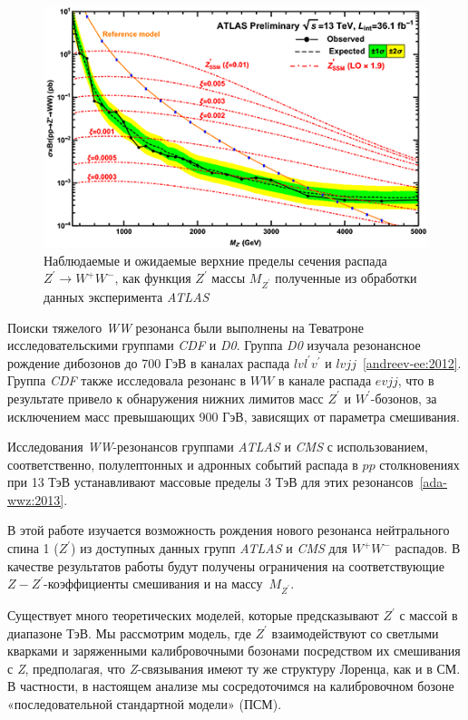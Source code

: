 \begin{figure}[!h]
	\centering
	\includegraphics[width=\textwidth]{figures/graph-1-verify.png}
	\caption{Наблюдаемые и ожидаемые верхние пределы сечения распада ${Z}^{\prime} \rightarrow {W}^{+}{W}^{-} $, как функция ${Z}^{\prime}$ массы ${M}_{{Z}^{\prime}}$ полученные из обработки данных эксперимента \textit{ATLAS}~\cite{2part-pankov}}
	\label{fig:graph-1-verify}
\end{figure}

Поиски тяжелого \textit{WW} резонанса были выполнены на Теватроне исследовательскими группами \textit{CDF} и \textit{D0}. Группа \textit{D0} изучала резонансное рождение дибозонов до 700 ГэВ в каналах распада $lvl^\prime v^\prime$ и $lvjj$~\ref{andreev-ee:2012}. Группа \textit{CDF} также исследовала резонанс в $WW$ в канале распада $evjj$, что в результате привело к обнаружения нижних лимитов масс $Z^\prime$
и $W^\prime$-бозонов, за исключением масс превышающих 900 ГэВ, зависящих от параметра смешивания.

Исследования \textit{WW}-резонансов группами \textit{ATLAS} и \textit{CMS} с использованием, соответственно, полулептонных и адронных событий распада в $pp$ столкновениях при 13 ТэВ устанавливают массовые пределы 3 ТэВ для этих резонансов~\ref{ada-wwz:2013}. 

В этой работе изучается возможность рождения нового резонанса нейтрального спина 1 ($Z^\prime$) из доступных данных групп \textit{ATLAS} и \textit{CMS} для $W^+W^-$ распадов. В качестве результатов работы будут получены ограничения на соответствующие $Z-Z^\prime$-коэффициенты смешивания и на массу~$M_{Z^\prime}$.

Существует много теоретических моделей, которые предсказывают $Z^\prime$ с массой в диапазоне ТэВ. Мы рассмотрим модель, где $Z^\prime$ взаимодействуют со светлыми кварками и заряженными калибровочными бозонами посредством их смешивания с \textit{Z}, предполагая, что \textit{Z}-связывания имеют ту же структуру Лоренца, как и в СМ. В частности, в настоящем анализе мы сосредоточимся на калибровочном бозоне «последовательной стандартной модели» (ПСМ).


